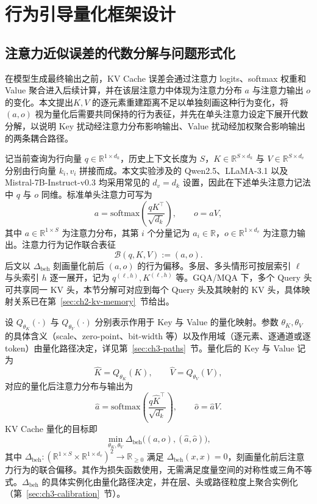 \chapter{行为引导量化框架设计}

\section{注意力近似误差的代数分解与问题形式化}
\label{sec:ch3-problem}

在模型生成最终输出之前，KV Cache 误差会通过注意力 logits、softmax 权重和 Value 聚合进入后续计算，并在该层注意力中体现为注意力分布 $a$ 与注意力输出 $o$ 的变化。本文提出$K,V$ 的逐元素重建距离不足以单独刻画这种行为变化，将 $(a,o)$ 视为量化后需要共同保持的行为表征，并先在单头注意力设定下展开代数分解，以说明 Key 扰动经注意力分布影响输出、Value 扰动经加权聚合影响输出的两条耦合路径。

记当前查询为行向量 $q\in\mathbb{R}^{1\times d_k}$，历史上下文长度为 $S$，$K\in\mathbb{R}^{S\times d_k}$ 与 $V\in\mathbb{R}^{S\times d_v}$ 分别由行向量 $k_i, v_i$ 拼接而成。本文实验涉及的 Qwen2.5、LLaMA-3.1 以及 Mistral-7B-Instruct-v0.3 均采用常见的 $d_v=d_k$ 设置，因此在下述单头注意力记法中 $q$ 与 $o$ 同维。标准单头注意力可写为
\begin{equation}
a=\mathrm{softmax}\!\left(\frac{qK^\top}{\sqrt{d_k}}\right), \qquad o=aV,
\end{equation}
其中 $a\in\mathbb{R}^{1\times S}$ 为注意力分布，其第 $i$ 个分量记为 $a_i\in\mathbb{R}$，$o\in\mathbb{R}^{1\times d_v}$ 为注意力输出。注意力行为记作联合表征
\begin{equation}
\mathcal{B}(q,K,V):=(a,o).
\end{equation}
后文以 $\Delta_{\mathrm{beh}}$ 刻画量化前后 $(a,o)$ 的行为偏移。多层、多头情形可按层索引 $\ell$ 与头索引 $h$ 逐一展开，记为 $q^{(\ell,h)}, K^{(\ell,h)}$ 等。GQA/MQA 下，多个 Query 头可共享同一 KV 头，本节分解可对应到每个 Query 头及其映射的 KV 头，具体映射关系已在第~\ref{sec:ch2-kv-memory}~节给出。

设 $Q_{\theta_K}(\cdot)$ 与 $Q_{\theta_V}(\cdot)$ 分别表示作用于 Key 与 Value 的量化映射。参数 $\theta_K, \theta_V$ 的具体含义（scale、zero-point、bit-width 等）以及作用域（逐元素、逐通道或逐 token）由量化路径决定，详见第~\ref{sec:ch3-paths}~节。量化后的 Key 与 Value 记为
\begin{equation}
\hat K = Q_{\theta_K}(K), \qquad \hat V = Q_{\theta_V}(V),
\end{equation}
对应的量化后注意力分布与输出为
\begin{equation}
\hat a=\mathrm{softmax}\!\left(\frac{q\hat K^\top}{\sqrt{d_k}}\right), \qquad \hat o=\hat a \hat V.
\end{equation}
KV Cache 量化的目标即
\begin{equation}
\min_{\theta_K,\theta_V}\Delta_{\mathrm{beh}}\big((a,o),(\hat a,\hat o)\big),
\end{equation}
其中 $\Delta_{\mathrm{beh}}: (\mathbb{R}^{1\times S}\times\mathbb{R}^{1\times d_v})^2 \to \mathbb{R}_{\ge 0}$ 满足 $\Delta_{\mathrm{beh}}(x,x)=0$，刻画量化前后注意力行为的联合偏移。其作为损失函数使用，无需满足度量空间的对称性或三角不等式。$\Delta_{\mathrm{beh}}$ 的具体实例化由量化路径决定，并在层、头或路径粒度上聚合实例化（第~\ref{sec:ch3-calibration}~节）。

